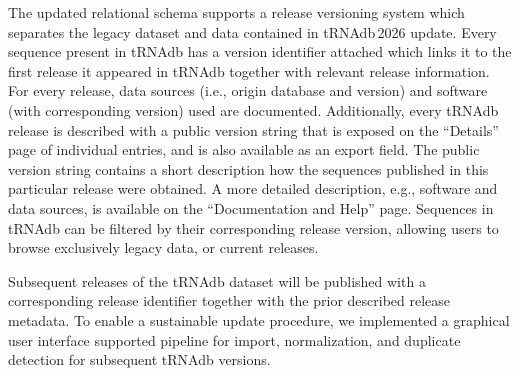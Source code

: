 \documentclass[unnumsec,webpdf,contemporary,large]{oup-authoring-template}
\newcommand{\TODO}[1]{\begingroup\color{red}#1\endgroup}
\newcommand{\OLD}[1]{\begingroup\color{gray}\scriptsize #1\endgroup}
\begin{document}
The updated relational schema supports a release versioning system which
separates the legacy dataset and data contained in tRNAdb\,2026
update. Every sequence present in tRNAdb has a version identifier attached
which links it to the first release it appeared in tRNAdb together with
relevant release information. For every release, data sources (i.e., origin
database and version) and software (with corresponding version) used are
documented. Additionally, every tRNAdb release is described with a public
version string that is exposed on the ``Details'' page of individual
entries, and is also available as an export field. The public version
string contains a short description how the sequences published in this
particular release were obtained. A more detailed description, e.g.,
software and data sources, is available on the ``Documentation and Help''
page.  Sequences in tRNAdb can be filtered by their corresponding release version, allowing users to browse exclusively legacy data, or current releases.

Subsequent releases of the tRNAdb dataset will be published with a corresponding release identifier together with the prior described release metadata. To enable a sustainable update procedure, we implemented a graphical user interface supported pipeline for import, normalization, and duplicate detection for subsequent tRNAdb versions.

%
%
%
%
\end{document}

